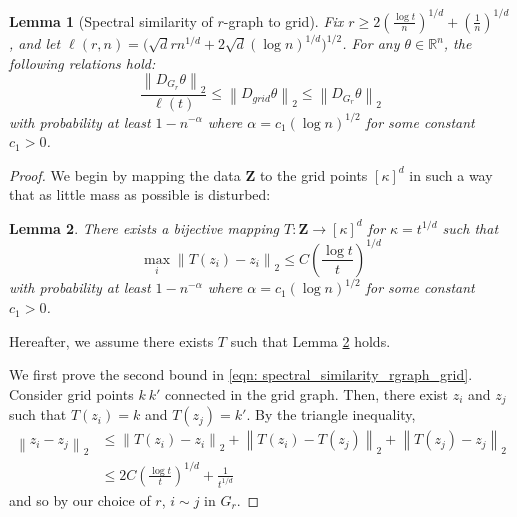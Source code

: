 \documentclass{article}
\newcommand{\Reals}{\mathbb{R}}
\newcommand{\norm}[1]{\left\lVert#1\right\rVert}
\newcommand{\1}{\mathbb{I}}
\newcommand{\Zbf}{\mathbf{Z}}
\theoremstyle{alden}
\theoremstyle{aldenthm}
\newtheorem{lemma}{Lemma}
\theoremstyle{definition}
\theoremstyle{remark}
\begin{document}
\begin{lemma}[Spectral similarity of $r$-graph to grid]
	\label{lem: spectral_similarity_rgraph_grid}
	Fix $r \geq 2 \left(\frac{\log t}{n}\right)^{1/d} + (\frac{1}{n})^{1/d}$, and let $\ell(r,n) = \biggl(\sqrt{d} r n^{1/d} + 2\sqrt{d}(\log n)^{1/d}\biggr)^{1/2}$. For any $\theta \in \Reals^n$, the following relations hold:
	\begin{equation}
	\label{eqn: spectral_similarity_rgraph_grid}
	\frac{\norm{D_{G_r}\theta}_2}{\ell(t)} \leq \norm{D_{grid}\theta}_2 \leq \norm{D_{G_r}\theta}_2
	\end{equation}
	with probability at least $1 - n^{-\alpha}$ where $\alpha = c_1 (\log n)^{1/2}$ for some constant $c_1 > 0$.
\end{lemma}
\begin{proof}
	We begin by mapping the data $\Zbf$ to the grid points $[\kappa]^d$ in such a way that as little mass as possible is disturbed:
	\begin{lemma}
		\label{lem: mass_transport_mapping}
		There exists a bijective mapping $T: \Zbf \to [\kappa]^d$ for $\kappa = t^{1/d}$ such that
		\begin{equation*}
		\max_{i} \norm{T(z_i) - z_i}_2 \leq C\left(\frac{\log t}{t}\right)^{1/d}
		\end{equation*}
		with probability at least $1 - n^{-\alpha}$ where $\alpha = c_1 (\log n)^{1/2}$ for some constant $c_1 > 0$.
	\end{lemma}
	Hereafter, we assume there exists $T$ such that Lemma \ref{lem: mass_transport_mapping} holds.
	
	We first prove the second bound in \eqref{eqn: spectral_similarity_rgraph_grid}.  Consider grid points $k ~ k'$ connected in the grid graph. Then, there exist $z_i$ and $z_j$ such that $T(z_i) = k$ and $T(z_j) = k'$. By the triangle inequality,
	\begin{align*}
	\norm{z_i - z_j}_2 & \leq \norm{T(z_i) - z_i}_2 + \norm{T(z_i) - T(z_j)}_2 + \norm{T(z_j) - z_j}_2 \\
	& \leq 2C\left(\frac{\log t}{t}\right)^{1/d} + \frac{1}{t^{1/d}}
	\end{align*}
	and so by our choice of $r$, $i \sim j$ in $G_r$.
	

\end{proof}
\end{document}
